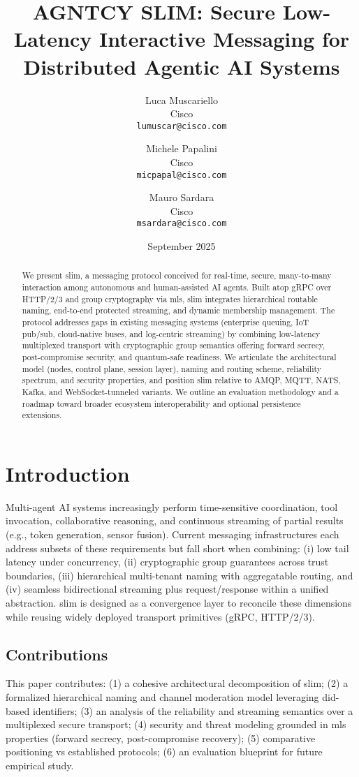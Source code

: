 \documentclass{article}
\title{AGNTCY SLIM: Secure Low-Latency Interactive Messaging for Distributed Agentic AI Systems}
\author{Luca Muscariello \\ Cisco \\ \texttt{lumuscar@cisco.com}
  \and Michele Papalini \\ Cisco \\ \texttt{micpapal@cisco.com}
  \and Mauro Sardara \\ Cisco \\ \texttt{msardara@cisco.com}}
\date{September 2025}
\newcommand{\HTTP}{HTTP/2\slash3}
\theoremstyle{definition}
\theoremstyle{remark}
\begin{document}
\maketitle
\begin{abstract}
We present \gls{slim}, a messaging protocol conceived for real-time, secure, many-to-many interaction among autonomous and human-assisted AI agents. Built atop gRPC over \HTTP{} and group cryptography via \gls{mls}, \gls{slim} integrates hierarchical routable naming, end-to-end protected streaming, and dynamic membership management. The protocol addresses gaps in existing messaging systems (enterprise queuing, IoT pub/sub, cloud-native buses, and log-centric streaming) by combining low-latency multiplexed transport with cryptographic group semantics offering forward secrecy, post-compromise security, and quantum-safe readiness. We articulate the architectural model (nodes, control plane, session layer), naming and routing scheme, reliability spectrum, and security properties, and position \gls{slim} relative to AMQP, MQTT, NATS, Kafka, and WebSocket-tunneled variants. We outline an evaluation methodology and a roadmap toward broader ecosystem interoperability and optional persistence extensions.
\end{abstract}

\tableofcontents

\section{Introduction}\label{sec:intro}
Multi-agent AI systems increasingly perform time-sensitive coordination, tool invocation, collaborative reasoning, and continuous streaming of partial results (e.g., token generation, sensor fusion). Current messaging infrastructures each address subsets of these requirements but fall short when combining: (i) low tail latency under concurrency, (ii) cryptographic group guarantees across trust boundaries, (iii) hierarchical multi-tenant naming with aggregatable routing, and (iv) seamless bidirectional streaming plus request/response within a unified abstraction. \gls{slim} is designed as a convergence layer to reconcile these dimensions while reusing widely deployed transport primitives (gRPC, \HTTP{}).

\subsection{Contributions}
This paper contributes: (1) a cohesive architectural decomposition of \gls{slim}; (2) a formalized hierarchical naming and channel moderation model leveraging \gls{did}-based identifiers; (3) an analysis of the reliability and streaming semantics over a multiplexed secure transport; (4) security and threat modeling grounded in \gls{mls} properties (forward secrecy, post-compromise recovery); (5) comparative positioning vs established protocols; (6) an evaluation blueprint for future empirical study.
\end{document}
